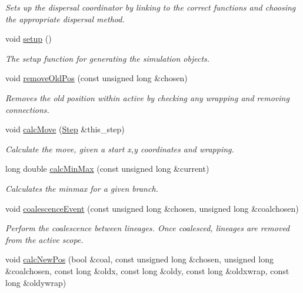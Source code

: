 \begin{DoxyCompactItemize}
\begin{DoxyCompactList}\small\item\em Sets up the dispersal coordinator by linking to the correct functions and choosing the appropriate dispersal method. \end{DoxyCompactList}\item 
void \hyperlink{class_tree_aec10ea2b720edc13a38310afdfe2b6e4}{setup} ()
\begin{DoxyCompactList}\small\item\em The setup function for generating the simulation objects. \end{DoxyCompactList}\item 
void \hyperlink{class_tree_a351650bda95319b2213c2234fa930f49}{remove\+Old\+Pos} (const unsigned long \&chosen)
\begin{DoxyCompactList}\small\item\em Removes the old position within active by checking any wrapping and removing connections. \end{DoxyCompactList}\item 
void \hyperlink{class_tree_afeb039e194f964582905951f510b096c}{calc\+Move} (\hyperlink{struct_step}{Step} \&this\+\_\+step)
\begin{DoxyCompactList}\small\item\em Calculate the move, given a start x,y coordinates and wrapping. \end{DoxyCompactList}\item 
long double \hyperlink{class_tree_a70a652ff4273d83e642257e4f5b5dd47}{calc\+Min\+Max} (const unsigned long \&current)
\begin{DoxyCompactList}\small\item\em Calculates the minmax for a given branch. \end{DoxyCompactList}\item 
void \hyperlink{class_tree_a16eedb70009e7570d933f88e8ce44117}{coalescence\+Event} (const unsigned long \&chosen, unsigned long \&coalchosen)
\begin{DoxyCompactList}\small\item\em Perform the coalescence between lineages. Once coalesced, lineages are removed from the active scope. \end{DoxyCompactList}\item 
void \hyperlink{class_tree_a05a0e0f5f70d2763f9dad3bd54618c62}{calc\+New\+Pos} (bool \&coal, const unsigned long \&chosen, unsigned long \&coalchosen, const long \&oldx, const long \&oldy, const long \&oldxwrap, const long \&oldywrap)

\end{DoxyCompactItemize}
